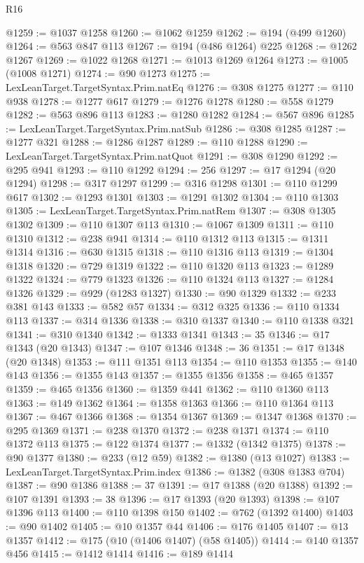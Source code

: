 \begin{lexlean}{R16}
\begin{coremodule}
@1259 := @1037 @1258
@1260 := @1062 @1259
@1262 := @194 (@499 @1260)
@1264 := @563 @847 @113
@1267 := @194 (@486 @1264) @225
@1268 := @1262 @1267
@1269 := @1022 @1268
@1271 := @1013 @1269 @1264
@1273 := @1005 (@1008 @1271)
@1274 := @90 @1273
@1275 := LexLeanTarget.TargetSyntax.Prim.natEq
@1276 := @308 @1275
@1277 := @110 @938
@1278 := @1277 @617
@1279 := @1276 @1278
@1280 := @558 @1279
@1282 := @563 @896 @113
@1283 := @1280 @1282
@1284 := @567 @896
@1285 := LexLeanTarget.TargetSyntax.Prim.natSub
@1286 := @308 @1285
@1287 := @1277 @321
@1288 := @1286 @1287
@1289 := @110 @1288
@1290 := LexLeanTarget.TargetSyntax.Prim.natQuot
@1291 := @308 @1290
@1292 := @295 @941
@1293 := @110 @1292
@1294 := 256
@1297 := @17 @1294 (@20 @1294)
@1298 := @317 @1297
@1299 := @316 @1298
@1301 := @110 @1299 @617
@1302 := @1293 @1301
@1303 := @1291 @1302
@1304 := @110 @1303
@1305 := LexLeanTarget.TargetSyntax.Prim.natRem
@1307 := @308 @1305 @1302
@1309 := @110 @1307 @113
@1310 := @1067 @1309
@1311 := @110 @1310
@1312 := @238 @941
@1314 := @110 @1312 @113
@1315 := @1311 @1314
@1316 := @630 @1315
@1318 := @110 @1316 @113
@1319 := @1304 @1318
@1320 := @729 @1319
@1322 := @110 @1320 @113
@1323 := @1289 @1322
@1324 := @779 @1323
@1326 := @110 @1324 @113
@1327 := @1284 @1326
@1329 := @929 (@1283 @1327)
@1330 := @90 @1329
@1332 := @233 @381 @143
@1333 := @582 @57
@1334 := @312 @325
@1336 := @110 @1334 @113
@1337 := @314 @1336
@1338 := @310 @1337
@1340 := @110 @1338 @321
@1341 := @310 @1340
@1342 := @1333 @1341
@1343 := 35
@1346 := @17 @1343 (@20 @1343)
@1347 := @107 @1346
@1348 := 36
@1351 := @17 @1348 (@20 @1348)
@1353 := @111 @1351 @113
@1354 := @110 @1353
@1355 := @140 @143
@1356 := @1355 @143
@1357 := @1355 @1356
@1358 := @465 @1357
@1359 := @465 @1356
@1360 := @1359 @441
@1362 := @110 @1360 @113
@1363 := @149 @1362
@1364 := @1358 @1363
@1366 := @110 @1364 @113
@1367 := @467 @1366
@1368 := @1354 @1367
@1369 := @1347 @1368
@1370 := @295 @1369
@1371 := @238 @1370
@1372 := @238 @1371
@1374 := @110 @1372 @113
@1375 := @122 @1374
@1377 := @1332 (@1342 @1375)
@1378 := @90 @1377
@1380 := @233 (@12 @59)
@1382 := @1380 (@13 @1027)
@1383 := LexLeanTarget.TargetSyntax.Prim.index
@1386 := @1382 (@308 @1383 @704)
@1387 := @90 @1386
@1388 := 37
@1391 := @17 @1388 (@20 @1388)
@1392 := @107 @1391
@1393 := 38
@1396 := @17 @1393 (@20 @1393)
@1398 := @107 @1396 @113
@1400 := @110 @1398 @150
@1402 := @762 (@1392 @1400)
@1403 := @90 @1402
@1405 := @10 @1357 @44
@1406 := @176 @1405
@1407 := @13 @1357
@1412 := @175 (@10 (@1406 @1407) (@58 @1405))
@1414 := @140 @1357 @456
@1415 := @1412 @1414
@1416 := @189 @1414

\end{coremodule}
\end{lexlean}
